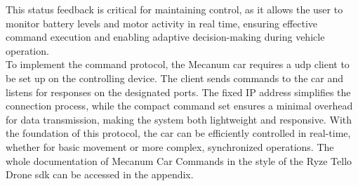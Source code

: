 This status feedback is critical for maintaining control, as it allows the user to monitor battery levels and motor activity in real time, ensuring effective command execution and enabling adaptive decision-making during vehicle operation.\\
To implement the command protocol, the Mecanum car requires a \ac{udp} client to be set up on the controlling device. The client sends commands to the car and listens for responses on the designated ports. The fixed IP address simplifies the connection process, while the compact command set ensures a minimal overhead for data transmission, making the system both lightweight and responsive. With the foundation of this protocol, the car can be efficiently controlled in real-time, whether for basic movement or more complex, synchronized operations. The whole documentation of Mecanum Car Commands in the style of the Ryze Tello Drone \ac{sdk} can be accessed in the appendix.